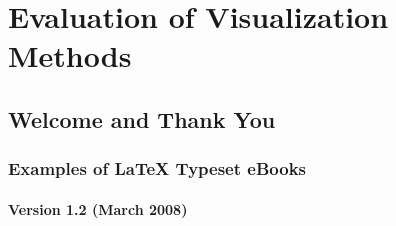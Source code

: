 \chapter{Evaluation of Visualization Methods}
\label{Chapter5}

\section{Welcome and Thank You}

\subsection{Examples of \LaTeX{} Typeset eBooks}

\subsubsection*{Version 1.2 (March 2008)}
